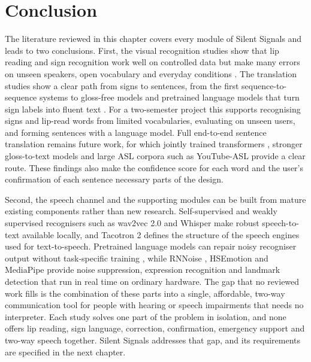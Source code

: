 \documentclass{FastFyp}
\begin{document}
\section{Conclusion}
The literature reviewed in this chapter covers every module of Silent Signals and leads to two conclusions. First, the visual recognition studies show that lip reading and sign recognition work well on controlled data but make many errors on unseen speakers, open vocabulary and everyday conditions \cite{assael2016lipnet,ref:Chung:2016,ref:Afouras:2018,koller2016deepsign,ref:Li:2020}. The translation studies show a clear path from signs to sentences, from the first sequence-to-sequence systems to gloss-free models and pretrained language models that turn sign labels into fluent text \cite{ref:Camgoz:2018,ref:ZhouB:2023,ref:Chen:2026}. For a two-semester project this supports recognising signs and lip-read words from limited vocabularies, evaluating on unseen users, and forming sentences with a language model. Full end-to-end sentence translation remains future work, for which jointly trained transformers \cite{ref:Camgoz:2020}, stronger gloss-to-text models \cite{ref:Yin:2020} and large ASL corpora such as YouTube-ASL \cite{ref:Uthus:2023} provide a clear route. These findings also make the confidence score for each word and the user's confirmation of each sentence necessary parts of the design.

Second, the speech channel and the supporting modules can be built from mature existing components rather than new research. Self-supervised and weakly supervised recognisers such as wav2vec 2.0 and Whisper \cite{baevski2020wav2vec,radford2023whisper} make robust speech-to-text available locally, and Tacotron 2 \cite{shen2018tacotron2} defines the structure of the speech engines used for text-to-speech. Pretrained language models can repair noisy recogniser output without task-specific training \cite{ma2025llmasr}, while RNNoise \cite{valin2018hybrid}, HSEmotion \cite{savchenko2022hsemotion} and MediaPipe \cite{lugaresi2019mediapipe} provide noise suppression, expression recognition and landmark detection that run in real time on ordinary hardware. The gap that no reviewed work fills is the combination of these parts into a single, affordable, two-way communication tool for people with hearing or speech impairments that needs no interpreter. Each study solves one part of the problem in isolation, and none offers lip reading, sign language, correction, confirmation, emergency support and two-way speech together. Silent Signals addresses that gap, and its requirements are specified in the next chapter.
\pagebreak
\end{document}
